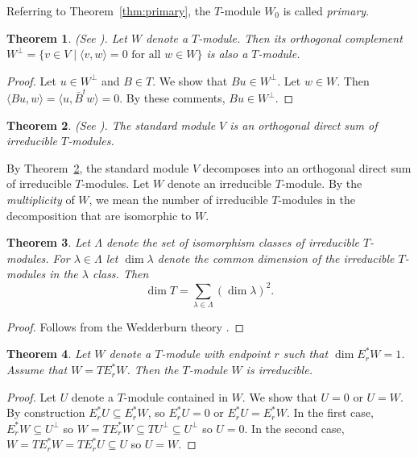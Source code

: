 \documentclass[12pt,letterpaper]{article}
\newtheorem{theorem}{Theorem}
\begin{document}
Referring to Theorem~\ref{thm:primary}, the $T$-module $W_0$ is called {\it primary}.


\begin{theorem}\label{thm:orthocomp}{\rm (See \cite{terwilliger2022,Terwilliger1992}).}
Let $W$ denote a $T$-module. Then its orthogonal complement 
$W^\perp = \{v \in V \mid \langle v,w\rangle = 0 \text{ for all } w \in W\}$ 
is also a $T$-module.
\end{theorem}
\begin{proof}
Let $u \in W^\perp$ and $B \in T$. We show that $B u \in W^\perp$. Let $w\in W$. Then $\langle Bu, w\rangle = \langle u, \bar{B}^t w\rangle = 0$. By these comments, $B u \in W^\perp$.

\end{proof}

\begin{theorem}\label{thm:directsum} {\rm (See \cite[Lemma~3.4]{Terwilliger1992}).}
The standard module $V$ is an orthogonal direct sum of irreducible $T$-modules.
\end{theorem}

By Theorem~\ref{thm:directsum}, the standard module $V$ decomposes into an orthogonal direct sum of irreducible $T$-modules. Let $W$ denote an irreducible $T$-module. By the \textit{multiplicity} of $W$, we mean the number of irreducible $T$-modules in the decomposition that are isomorphic to $W$.

\begin{theorem}\label{thm:Wedderburn}
Let $\Lambda$ denote the set of isomorphism classes of irreducible $T$-modules. 
For $\lambda\in\Lambda$ let $\dim\lambda$ denote the common dimension 
of the irreducible $T$-modules in the $\lambda$ class. Then 
\[
  \dim T = \sum_{\lambda\in\Lambda}(\dim\lambda)^2.
\]
\end{theorem}
\begin{proof}

Follows from the Wedderburn theory \cite{CurtisReiner1962}.
\end{proof}

\begin{theorem}\label{thm:irred}
Let $W$ denote a $T$-module with endpoint $r$ such that $\dim E_r^* W  = 1$. Assume that $W = T E_r^* W$. Then the $T$-module $W$ is irreducible.
\end{theorem}
\begin{proof}
Let $U$ denote a $T$-module contained in $W$. We show that $U=0$ or $U=W$.
By construction $E^*_r U \subseteq E^*_rW$, so $E^*_r U=0$ or $E^*_rU=E^*_rW$.
In the first case, $E^*_rW \subseteq U^\perp$ so $W = TE^*_rW \subseteq T U^\perp
\subseteq U^\perp$ so $U=0$. In the second case, $W=TE^*_rW=T E^*_r U \subseteq U$
so $U=W$.
\end{proof}
\end{document}
